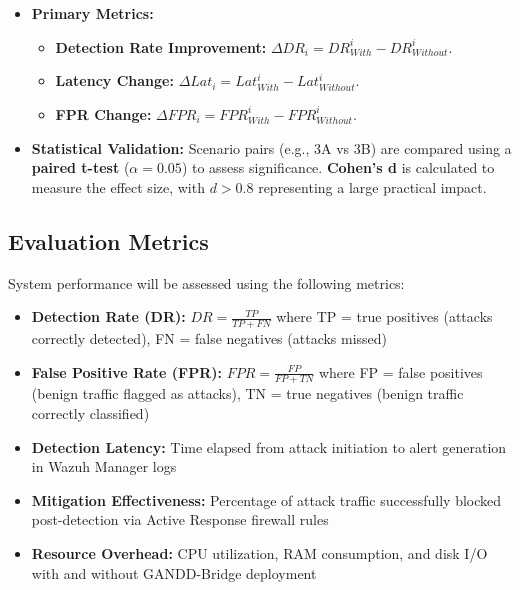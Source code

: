 \begin{itemize}
    \item \textbf{Primary Metrics:}
    \begin{itemize}
        \item \textbf{Detection Rate Improvement:} $\Delta DR_i = DR_{With}^i - DR_{Without}^i$.
        \item \textbf{Latency Change:} $\Delta Lat_i = Lat_{With}^i - Lat_{Without}^i$.
        \item \textbf{FPR Change:} $\Delta FPR_i = FPR_{With}^i - FPR_{Without}^i$.
    \end{itemize}
    \item \textbf{Statistical Validation:} Scenario pairs (e.g., 3A vs 3B) are compared using a \textbf{paired t-test} ($\alpha = 0.05$) to assess significance. \textbf{Cohen’s d} is calculated to measure the effect size, with $d > 0.8$ representing a large practical impact.
\end{itemize}

\subsection{Evaluation Metrics}

System performance will be assessed using the following metrics:

\begin{itemize}
    \item \textbf{Detection Rate (DR):} $DR = \frac{TP}{TP + FN}$ where TP = true positives (attacks correctly detected), FN = false negatives (attacks missed)
    
    \item \textbf{False Positive Rate (FPR):} $FPR = \frac{FP}{FP + TN}$ where FP = false positives (benign traffic flagged as attacks), TN = true negatives (benign traffic correctly classified)
    
    \item \textbf{Detection Latency:} Time elapsed from attack initiation to alert generation in Wazuh Manager logs
    
    \item \textbf{Mitigation Effectiveness:} Percentage of attack traffic successfully blocked post-detection via Active Response firewall rules
    
    \item \textbf{Resource Overhead:} CPU utilization, RAM consumption, and disk I/O with and without GANDD-Bridge deployment
\end{itemize}

